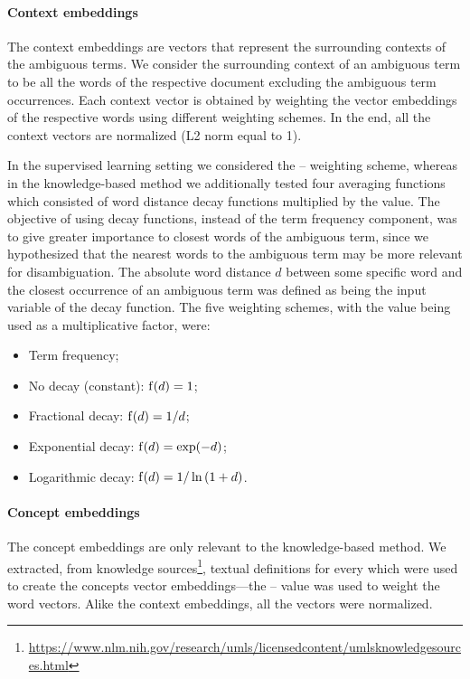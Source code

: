 \paragraph{Context embeddings}

The context embeddings are vectors that represent the surrounding contexts of the ambiguous terms.
We consider the surrounding context of an ambiguous term to be all the words of the respective document excluding the ambiguous term occurrences.
Each context vector is obtained by weighting the vector embeddings of the respective words using different weighting schemes.
In the end, all the context vectors are normalized (L2 norm equal to 1).

In the supervised learning setting we considered the -- weighting scheme, whereas in the knowledge-based method we additionally tested four averaging functions which consisted of word distance decay functions multiplied by the  value.
The objective of using decay functions, instead of the term frequency component, was to give greater importance to closest words of the ambiguous term, since we hypothesized that the nearest words to the ambiguous term may be more relevant for disambiguation.
The absolute word distance $d$ between some specific word and the closest occurrence of an ambiguous term was defined as being the input variable of the decay function.
The five weighting schemes, with the  value being used as a multiplicative factor, were:

\begin{itemize}
\item
Term frequency;
\item
No decay (constant): $\operatorname{f}(d) = 1$;
\item
Fractional decay: $\operatorname{f}(d) = 1 / d$;
\item
Exponential decay: $\operatorname{f}(d) = \exp(-d)$;
\item
Logarithmic decay: $\operatorname{f}(d) = 1 / \ln{\left(1 + d\right)}$.
\end{itemize}


\paragraph{Concept embeddings}

The concept embeddings are only relevant to the knowledge-based method.
We extracted, from  knowledge sources\footnote{\url{https://www.nlm.nih.gov/research/umls/licensedcontent/umlsknowledgesources.html}}, textual definitions for every  which were used to create the concepts vector embeddings---the -- value was used to weight the word vectors.
Alike the context embeddings, all the vectors were normalized.


